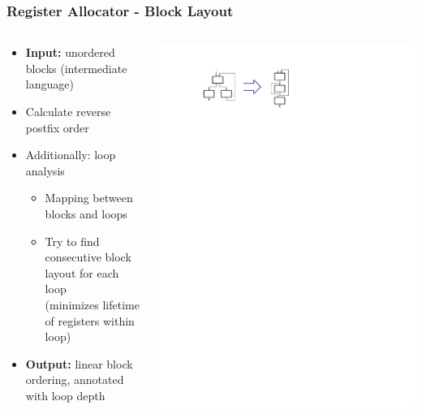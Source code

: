 \documentclass[navbaroff,en]{sdqbeamer}
\begin{document}
\begin{frame}
\frametitle{Register Allocator - Block Layout}

	\begin{columns}
		\begin{column}{0.65\textwidth}
			\begin{itemize}
				\item \textbf{Input:} unordered blocks (intermediate language)
				\item Calculate reverse postfix order
				\item Additionally: loop analysis
					\begin{itemize}
						\item Mapping between blocks and loops
						\item Try to find consecutive block layout for each loop\\ (minimizes lifetime of registers within loop)
					\end{itemize}
				\item \textbf{Output:} linear block ordering, annotated with loop depth
			\end{itemize}
		\end{column}
	
		 \begin{column}{0.35\textwidth}
		 	\centering \includegraphics[scale=0.7]{images/block_layout.pdf}
		 \end{column}
	\end{columns}

\end{frame}
\end{document}
